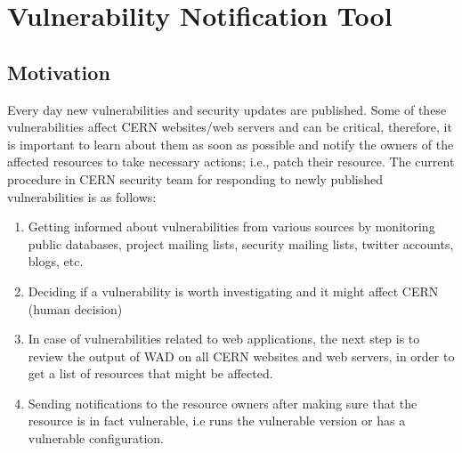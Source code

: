 \chapter{Vulnerability Notification Tool}
\label{chap5-vulnerability-notification-tool}
\thispagestyle{empty}

\section{Motivation}

Every day new vulnerabilities and security updates are published. Some of these vulnerabilities affect CERN websites/web servers and can be critical, therefore, it is important to learn about them as soon as possible and notify the owners of the affected resources to take necessary actions; i.e., patch their resource. The current procedure in CERN security team for responding to newly published vulnerabilities is as follows:
\begin{enumerate}
\item Getting informed about vulnerabilities from various sources by monitoring public databases, project mailing lists, security mailing lists, twitter accounts, blogs, etc.
\item Deciding if a vulnerability is worth investigating and it might affect CERN (human decision)
\item In case of vulnerabilities related to web applications, the next step is to review the output of WAD on all CERN websites and web servers, in order to get a list of resources that might be affected.
\item Sending notifications to the resource owners after making sure that the resource is in fact vulnerable, i.e runs the vulnerable version or has a vulnerable configuration.
\end{enumerate}

